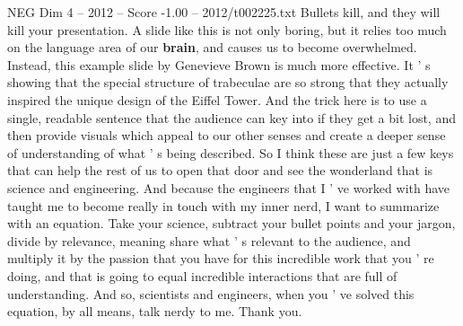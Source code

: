 \begin{textsample}{NEG Dim 4 – 2012 – Score -1.00 – 2012/t002225.txt}
Bullets kill, and they will kill your presentation.
A slide like this is not only boring, but it relies too much on the language area of our \textbf{brain}, and causes us to become overwhelmed.
Instead, this example slide by Genevieve Brown is much more effective.
It ' s showing that the special structure of trabeculae are so strong that they actually inspired the unique design of the Eiffel Tower.
And the trick here is to use a single, readable sentence that the audience can key into if they get a bit lost, and then provide visuals which appeal to our other senses and create a deeper sense of understanding of what ' s being described.
So I think these are just a few keys that can help the rest of us to open that door and see the wonderland that is science and engineering.
And because the engineers that I ' ve worked with have taught me to become really in touch with my inner nerd, I want to summarize with an equation.
Take your science, subtract your bullet points and your jargon, divide by relevance, meaning share what ' s relevant to the audience, and multiply it by the passion that you have for this incredible work that you ' re doing, and that is going to equal incredible interactions that are full of understanding.
And so, scientists and engineers, when you ' ve solved this equation, by all means, talk nerdy to me.
Thank you.

\end{textsample}
